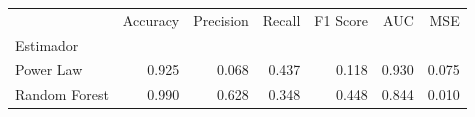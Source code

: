 \begin{tabular}{lrrrrrr}
\toprule
 & Accuracy & Precision & Recall & F1 Score & AUC & MSE \\
Estimador &  &  &  &  &  &  \\
\midrule
Power Law & 0.925 & 0.068 & 0.437 & 0.118 & 0.930 & 0.075 \\
Random Forest & 0.990 & 0.628 & 0.348 & 0.448 & 0.844 & 0.010 \\
\bottomrule
\end{tabular}

